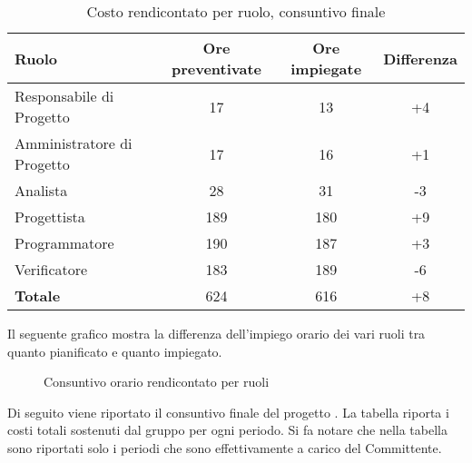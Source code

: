 \begin{table}[h]
	\centering
	\begin{tabular}{|l|c|c|c|}
		\toprule
		\textbf{Ruolo} & \textbf{Ore preventivate} & \textbf{Ore impiegate} & \textbf{Differenza} \\
		
		\midrule
		Responsabile di Progetto & 17 & 13 & +4 \\
		Amministratore di Progetto & 17 & 16 & +1 \\ 
		Analista & 28 & 31 & -3 \\
		Progettista & 189 & 180 & +9 \\
		Programmatore & 190 & 187 & +3 \\
		Verificatore & 183 & 189 & -6 \\
		\midrule
		\textbf{Totale} & 624 & 616 & +8 \\
		
		\bottomrule
	\end{tabular}
	\caption{Costo rendicontato per ruolo, consuntivo finale}
\end{table}

\newpage
\noindent Il seguente grafico mostra la differenza dell'impiego orario dei vari ruoli tra quanto pianificato e quanto impiegato.

\begin{figure}[h]
	\centering
	\caption{Consuntivo orario rendicontato per ruoli}
\end{figure}

\noindent Di seguito viene riportato il consuntivo finale del progetto \PROGETTO{}. La tabella riporta i costi totali sostenuti dal gruppo per ogni periodo. Si fa notare che nella tabella sono riportati solo i periodi che sono effettivamente a carico del Committente.

